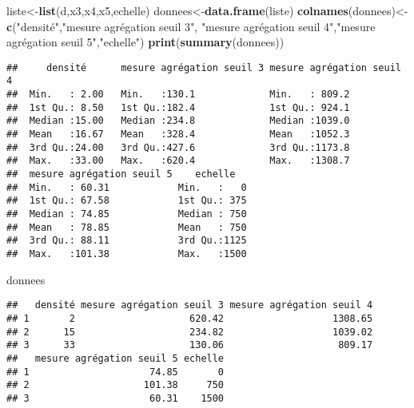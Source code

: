 \documentclass[
]{article}
\newenvironment{Shaded}{\begin{snugshade}}{\end{snugshade}}
\newcommand{\KeywordTok}[1]{\textcolor[rgb]{0.13,0.29,0.53}{\textbf{#1}}}
\newcommand{\NormalTok}[1]{#1}
\newcommand{\StringTok}[1]{\textcolor[rgb]{0.31,0.60,0.02}{#1}}
\begin{document}
\begin{Shaded}
\begin{Highlighting}[]
\NormalTok{liste<-}\KeywordTok{list}\NormalTok{(d,x3,x4,x5,echelle)}
\NormalTok{donnees<-}\KeywordTok{data.frame}\NormalTok{(liste)}
\KeywordTok{colnames}\NormalTok{(donnees)<-}\KeywordTok{c}\NormalTok{(}\StringTok{"densité"}\NormalTok{,}\StringTok{"mesure agrégation seuil 3"}\NormalTok{, }\StringTok{"mesure agrégation seuil 4"}\NormalTok{,}\StringTok{"mesure agrégation seuil 5"}\NormalTok{,}\StringTok{"echelle"}\NormalTok{)}
\KeywordTok{print}\NormalTok{(}\KeywordTok{summary}\NormalTok{(donnees))}
\end{Highlighting}
\end{Shaded}

\begin{verbatim}
##     densité      mesure agrégation seuil 3 mesure agrégation seuil 4
##  Min.   : 2.00   Min.   :130.1             Min.   : 809.2           
##  1st Qu.: 8.50   1st Qu.:182.4             1st Qu.: 924.1           
##  Median :15.00   Median :234.8             Median :1039.0           
##  Mean   :16.67   Mean   :328.4             Mean   :1052.3           
##  3rd Qu.:24.00   3rd Qu.:427.6             3rd Qu.:1173.8           
##  Max.   :33.00   Max.   :620.4             Max.   :1308.7           
##  mesure agrégation seuil 5    echelle    
##  Min.   : 60.31            Min.   :   0  
##  1st Qu.: 67.58            1st Qu.: 375  
##  Median : 74.85            Median : 750  
##  Mean   : 78.85            Mean   : 750  
##  3rd Qu.: 88.11            3rd Qu.:1125  
##  Max.   :101.38            Max.   :1500
\end{verbatim}

\begin{Shaded}
\begin{Highlighting}[]
\NormalTok{donnees}
\end{Highlighting}
\end{Shaded}

\begin{verbatim}
##   densité mesure agrégation seuil 3 mesure agrégation seuil 4
## 1       2                    620.42                   1308.65
## 2      15                    234.82                   1039.02
## 3      33                    130.06                    809.17
##   mesure agrégation seuil 5 echelle
## 1                     74.85       0
## 2                    101.38     750
## 3                     60.31    1500
\end{verbatim}
\end{document}
